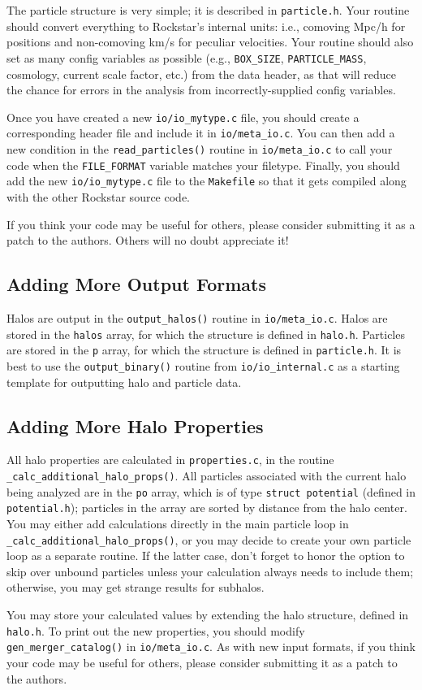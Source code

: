\documentclass[12pt]{article}
\begin{document}
The particle structure is very simple; it is described in \texttt{particle.h}.  Your routine should convert everything to Rockstar's internal units: i.e., comoving Mpc/h for positions and non-comoving km/s for peculiar velocities.  Your routine should also set as many config variables as possible (e.g., \texttt{BOX\_SIZE}, \texttt{PARTICLE\_MASS}, cosmology, current scale factor, etc.) from the data header, as that will reduce the chance for errors in the analysis from incorrectly-supplied config variables.

Once you have created a new \texttt{io/io\_mytype.c} file, you should create a corresponding header file and include it in \texttt{io/meta\_io.c}.  You can then add a new condition in the \texttt{read\_particles()} routine in \texttt{io/meta\_io.c} to call your code when the \texttt{FILE\_FORMAT} variable matches your filetype.  Finally, you should add the new \texttt{io/io\_mytype.c} file to the \texttt{Makefile} so that it gets compiled along with the other Rockstar source code.

If you think your code may be useful for others, please consider submitting it as a patch to the authors.  Others will no doubt appreciate it!

\subsection{Adding More Output Formats}

Halos are output in the \texttt{output\_halos()} routine in \texttt{io/meta\_io.c}.  Halos are stored in the \texttt{halos} array, for which the structure is defined in \texttt{halo.h}.  Particles are stored in the \texttt{p} array, for which the structure is defined in \texttt{particle.h}.  It is best to use the \texttt{output\_binary()} routine from \texttt{io/io\_internal.c} as a starting template for outputting halo and particle data.

\subsection{Adding More Halo Properties}
\label{s:new_properties}
All halo properties are calculated in \texttt{properties.c}, in the routine\\ \texttt{\_calc\_additional\_halo\_props()}.  All particles associated with the current halo being analyzed are in the \texttt{po} array, which is of type \texttt{struct potential} (defined in \texttt{potential.h}); particles in the array are sorted by distance from the halo center.  You may either add calculations directly in the main particle loop in \texttt{\_calc\_additional\_halo\_props()}, or you may decide to create your own particle loop as a separate routine.  If the latter case, don't forget to honor the option to skip over unbound particles unless your calculation always needs to include them; otherwise, you may get strange results for subhalos.

You may store your calculated values by extending the halo structure, defined in \texttt{halo.h}.  To print out the new properties, you should modify \texttt{gen\_merger\_catalog()} in \texttt{io/meta\_io.c}.  As with new input formats, if you think your code may be useful for others, please consider submitting it as a patch to the authors.
\end{document}
